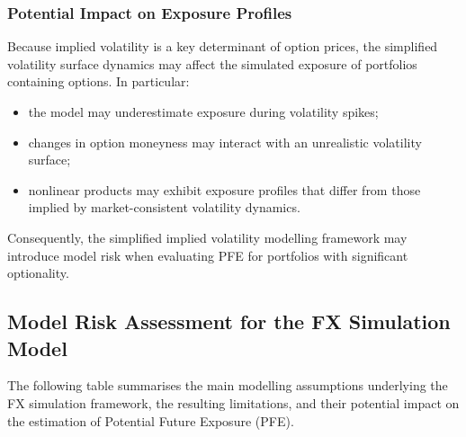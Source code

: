 \subsubsection{Potential Impact on Exposure Profiles}

Because implied volatility is a key determinant of option prices, the simplified volatility surface dynamics may affect the simulated exposure of portfolios containing options. In particular:

\begin{itemize}
	\item the model may underestimate exposure during volatility spikes;
	\item changes in option moneyness may interact with an unrealistic volatility surface;
	\item nonlinear products may exhibit exposure profiles that differ from those implied by market-consistent volatility dynamics.
\end{itemize}

Consequently, the simplified implied volatility modelling framework may introduce model risk when evaluating PFE for portfolios with significant optionality.



\newpage
\subsection{Model Risk Assessment for the FX Simulation Model}

The following table summarises the main modelling assumptions underlying the FX simulation framework, the resulting limitations, and their potential impact on the estimation of Potential Future Exposure (PFE).


